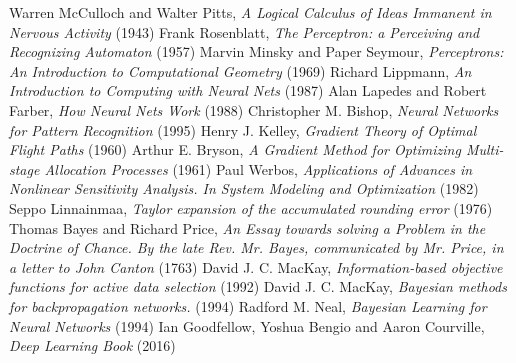  
\newpage
\begin{thebibliography}{100}
	Warren McCulloch and Walter Pitts,  \textit{A Logical Calculus of Ideas Immanent in Nervous Activity} (1943)
	 Frank Rosenblatt, \textit{The Perceptron: a Perceiving and Recognizing Automaton} (1957)
	 Marvin Minsky and Paper Seymour, \textit{Perceptrons: An Introduction to Computational Geometry} (1969)
	 Richard Lippmann, \textit{An Introduction to Computing with Neural Nets} (1987)
	 Alan Lapedes and Robert Farber, \textit{How Neural Nets Work} (1988) 
	Christopher M. Bishop, \textit{Neural Networks for Pattern Recognition} (1995)
	 Henry J. Kelley, \textit{Gradient Theory of Optimal Flight Paths} (1960)
	 Arthur E. Bryson, \textit{ A Gradient Method for Optimizing Multi-stage Allocation Processes} (1961)
	  Paul Werbos, \textit{Applications of Advances in Nonlinear Sensitivity Analysis. In System Modeling and Optimization} (1982) 
	 Seppo Linnainmaa, \textit{Taylor expansion of the accumulated rounding error} (1976)
	 Thomas Bayes and Richard Price, \textit{An Essay towards solving a Problem in the Doctrine of Chance. By the late Rev. Mr. Bayes, communicated by Mr. Price, in a letter to John Canton} (1763)
	 David J. C. MacKay, \textit{Information-based objective functions for active data selection} (1992) 
	David J. C. MacKay, \textit{Bayesian methods for backpropagation networks.} (1994)
	 Radford M. Neal, \textit{Bayesian Learning for Neural Networks} (1994) 
	 Ian Goodfellow, Yoshua Bengio and Aaron Courville, \textit{Deep Learning Book} (2016)
\end{thebibliography}

